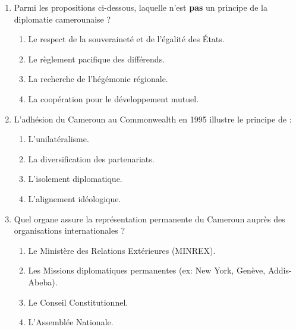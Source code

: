 \documentclass[11pt]{article}
\begin{document}
\begin{exercice}
\begin{enumerate}
    \item Parmi les propositions ci-dessous, laquelle n'est \textbf{pas} un principe de la diplomatie camerounaise ?
    \begin{enumerate}
        \item Le respect de la souveraineté et de l'égalité des États.
        \item Le règlement pacifique des différends.
        \item La recherche de l'hégémonie régionale.
        \item La coopération pour le développement mutuel.
    \end{enumerate}
    \item L'adhésion du Cameroun au Commonwealth en 1995 illustre le principe de :
    \begin{enumerate}
        \item L'unilatéralisme.
        \item La diversification des partenariats.
        \item L'isolement diplomatique.
        \item L'alignement idéologique.
    \end{enumerate}
    \item Quel organe assure la représentation permanente du Cameroun auprès des organisations internationales ?
    \begin{enumerate}
        \item Le Ministère des Relations Extérieures (MINREX).
        \item Les Missions diplomatiques permanentes (ex: New York, Genève, Addis-Abeba).
        \item Le Conseil Constitutionnel.
        \item L'Assemblée Nationale.
    \end{enumerate}
\end{enumerate}
\end{exercice}
\end{document}
